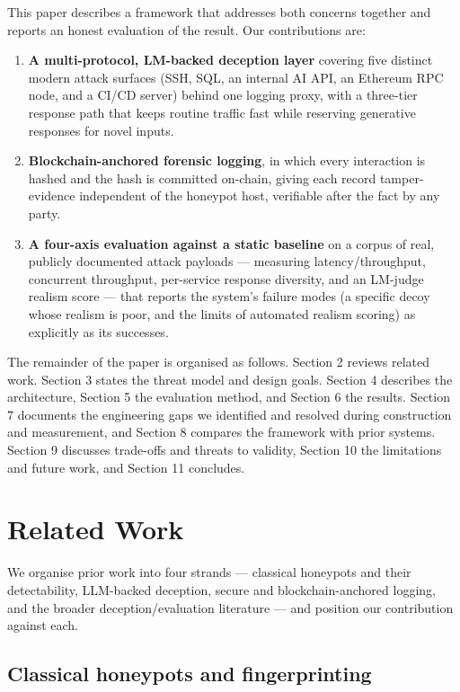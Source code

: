 \documentclass[conference]{IEEEtran}
\begin{document}
This paper describes a framework that addresses both concerns together and reports an honest evaluation of the result. Our contributions are:

\begin{enumerate}
\item \textbf{A multi-protocol, LM-backed deception layer} covering five distinct modern attack surfaces (SSH, SQL, an internal AI API, an Ethereum RPC node, and a CI/CD server) behind one logging proxy, with a three-tier response path that keeps routine traffic fast while reserving generative responses for novel inputs.
\item \textbf{Blockchain-anchored forensic logging}, in which every interaction is hashed and the hash is committed on-chain, giving each record tamper-evidence independent of the honeypot host, verifiable after the fact by any party.
\item \textbf{A four-axis evaluation against a static baseline} on a corpus of real, publicly documented attack payloads --- measuring latency/throughput, concurrent throughput, per-service response diversity, and an LM-judge realism score --- that reports the system's failure modes (a specific decoy whose realism is poor, and the limits of automated realism scoring) as explicitly as its successes.
\end{enumerate}

The remainder of the paper is organised as follows. Section 2 reviews related work. Section 3 states the threat model and design goals. Section 4 describes the architecture, Section 5 the evaluation method, and Section 6 the results. Section 7 documents the engineering gaps we identified and resolved during construction and measurement, and Section 8 compares the framework with prior systems. Section 9 discusses trade-offs and threats to validity, Section 10 the limitations and future work, and Section 11 concludes.

\section{Related Work}

We organise prior work into four strands --- classical honeypots and their detectability, LLM-backed deception, secure and blockchain-anchored logging, and the broader deception/evaluation literature --- and position our contribution against each.

\subsection{Classical honeypots and fingerprinting}
\end{document}
